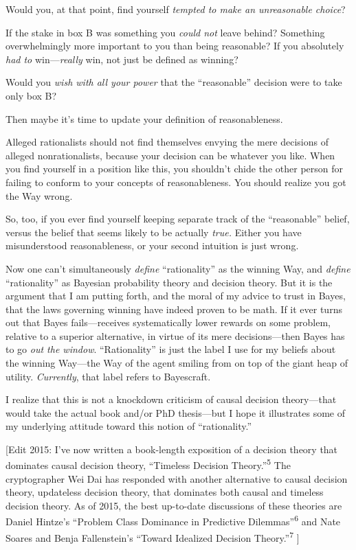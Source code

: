 {
 Would you, at that point, find yourself \textit{tempted to make an
unreasonable choice}?}

{
 If the stake in box B was something you \textit{could not} leave
behind? Something overwhelmingly more important to you than being
reasonable? If you absolutely \textit{had to} win---\textit{really}
win, not just be defined as winning?}

{
 Would you \textit{wish with all your power} that the
``reasonable'' decision were to take
only box B?}

{
 Then maybe it's time to update your definition of
reasonableness.}

{
 Alleged rationalists should not find themselves envying the mere
decisions of alleged nonrationalists, because your decision can be
whatever you like. When you find yourself in a position like this, you
shouldn't chide the other person for failing to conform
to your concepts of reasonableness. You should realize you got the Way
wrong.}

{
 So, too, if you ever find yourself keeping separate track of the
``reasonable'' belief, versus the
belief that seems likely to be actually \textit{true.} Either you have
misunderstood reasonableness, or your second intuition is just wrong.}

{
 Now one can't simultaneously \textit{define}
``rationality'' as the winning Way,
and \textit{define} ``rationality''
as Bayesian probability theory and decision theory. But it is the
argument that I am putting forth, and the moral of my advice to trust
in Bayes, that the laws governing winning have indeed proven to be
math. If it ever turns out that Bayes fails---receives systematically
lower rewards on some problem, relative to a superior alternative, in
virtue of its mere decisions---then Bayes has to go \textit{out the
window}. ``Rationality'' is just the
label I use for my beliefs about the winning Way---the Way of the agent
smiling from on top of the giant heap of utility. \textit{Currently},
that label refers to Bayescraft.}

{
 I realize that this is not a knockdown criticism of causal
decision theory---that would take the actual book and/or PhD
thesis---but I hope it illustrates some of my underlying attitude
toward this notion of
``rationality.''}

{
 [Edit 2015: I've now written a book-length
exposition of a decision theory that dominates causal decision theory,
``Timeless Decision
Theory.''\textsuperscript{5} The cryptographer Wei
Dai has responded with another alternative to causal decision theory,
updateless decision theory, that dominates both causal and timeless
decision theory. As of 2015, the best up-to-date discussions of these
theories are Daniel Hintze's ``Problem
Class Dominance in Predictive
Dilemmas''\textsuperscript{6} and Nate Soares and
Benja Fallenstein's ``Toward Idealized
Decision Theory.''\textsuperscript{7} ]}

